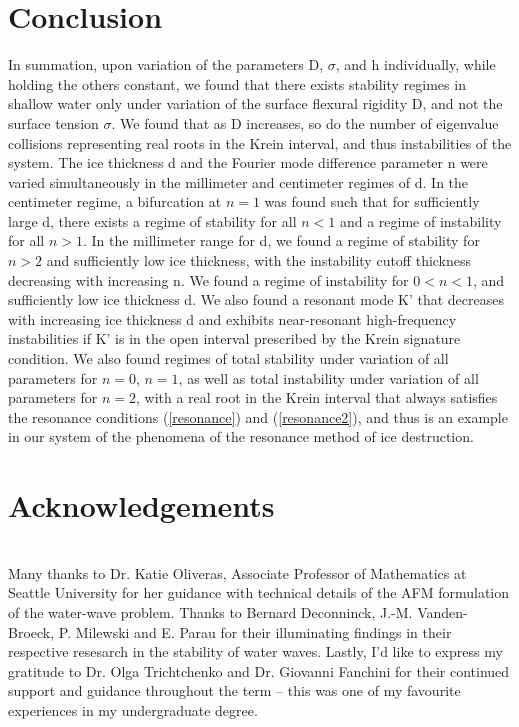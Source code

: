 \documentclass{article}
\begin{document}
\section{Conclusion}

In summation, upon variation of the parameters D, \(\sigma\), and h individually, while holding the others constant, we found that there exists stability regimes in shallow water only under variation of the surface flexural rigidity D, and not the surface tension \(\sigma\). We found that as D increases, so do the number of eigenvalue collisions representing real roots in the Krein interval, and thus instabilities of the system. The ice thickness d and the Fourier mode difference parameter n were varied simultaneously in the millimeter and centimeter regimes of d. In the centimeter regime, a bifurcation at \(n = 1\) was found such that for sufficiently large d, there exists a regime of stability for all \(n<1\) and a regime of instability for all \(n>1\). In the millimeter range for d, we found a regime of stability for \(n>2\) and sufficiently low ice thickness, with the instability cutoff thickness decreasing with increasing n. We found a regime of instability for \(0 < n < 1\), and sufficiently low ice thickness d. We also found a resonant mode K' that decreases with increasing ice thickness d and exhibits near-resonant high-frequency instabilities if K' is in the open interval prescribed by the Krein signature condition. We also found regimes of total stability under variation of all parameters for \(n = 0\), \(n = 1\), as well as total instability under variation of all parameters for \(n = 2\), with a real root in the Krein interval that always satisfies the resonance conditions (\ref{resonance}) and (\ref{resonance2}), and thus is an example in our system of the phenomena of the resonance method of ice destruction. 
\\

\section{Acknowledgements}
\\ 
Many thanks to Dr. Katie Oliveras, Associate Professor of Mathematics at Seattle University for her guidance with technical details of the AFM formulation of the water-wave problem. Thanks to Bernard Deconninck, J.-M. Vanden-Broeck, P. Milewski and E. Parau for their illuminating findings in their respective resesarch in the stability of water waves. Lastly, I'd like to express my gratitude to Dr. Olga Trichtchenko and Dr. Giovanni Fanchini for their continued support and guidance throughout the term -- this was one of my favourite experiences in my undergraduate degree.
\end{document}
